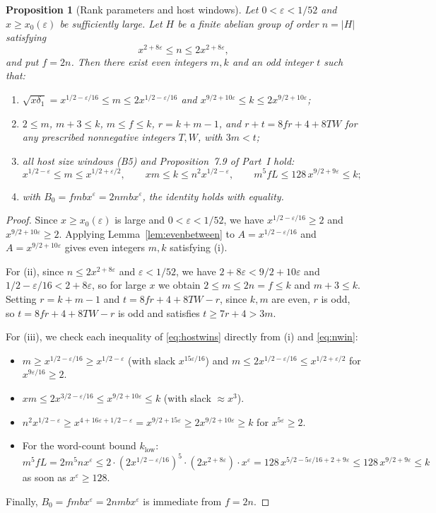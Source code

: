 \documentclass[11pt]{amsart}
\newcommand{\eps}{\varepsilon}
\theoremstyle{plain}
\newtheorem{proposition}[theorem]{Proposition}
\theoremstyle{definition}
\numberwithin{equation}{section}
\begin{document}
\begin{proposition}[Rank parameters and host windows]\label{prop:ranks}
Let $0<\eps<1/52$ and $x\ge x_0(\eps)$ be sufficiently large. Let $H$ be a finite abelian group of
order $n=|H|$ satisfying
\begin{equation}\label{eq:nwin}
x^{2+8\eps}\le n\le 2x^{2+8\eps},
\end{equation}
and put $f=2n$. Then there exist even integers $m,k$ and an odd integer $t$ such that:
\begin{enumerate}[label=(\roman*)]
\item $\sqrt{x\delta_1}=x^{1/2-\eps/16}\le m\le 2x^{1/2-\eps/16}$ and
  $x^{9/2+10\eps}\le k\le 2x^{9/2+10\eps}$;
\item $2\le m$, $m+3\le k$, $m\le f\le k$, $r=k+m-1$, and $r+t=8fr+4+8TW$ for any prescribed
  nonnegative integers $T,W$, with $3m<t$;
\item all host size windows \textup{(B5)} and Proposition~7.9 of Part~I hold:
  \begin{equation}\label{eq:hostwins}
  x^{1/2-\eps}\le m\le x^{1/2+\eps/2},\qquad xm\le k\le n^2 x^{1/2-\eps},\qquad
  m^5 f L\le 128\,x^{9/2+9\eps}\le k;
  \end{equation}
\item with $B_0=fmbx^\eps=2nmbx^\eps$, the identity  holds with equality.
\end{enumerate}
\end{proposition}

\begin{proof}
Since $x\ge x_0(\eps)$ is large and $0<\eps<1/52$, we have $x^{1/2-\eps/16}\ge2$ and
$x^{9/2+10\eps}\ge2$. Applying Lemma~\ref{lem:evenbetween} to $A=x^{1/2-\eps/16}$ and
$A=x^{9/2+10\eps}$ gives even integers $m,k$ satisfying (i).

For (ii), since $n\le 2x^{2+8\eps}$ and $\eps<1/52$, we have $2+8\eps<9/2+10\eps$ and
$1/2-\eps/16<2+8\eps$, so for large $x$ we obtain $2\le m\le 2n=f\le k$ and $m+3\le k$. Setting
$r=k+m-1$ and $t=8fr+4+8TW-r$, since $k,m$ are even, $r$ is odd, so $t=8fr+4+8TW-r$ is odd and
satisfies $t\ge 7r+4>3m$.

For (iii), we check each inequality of \eqref{eq:hostwins} directly from (i) and \eqref{eq:nwin}:
\begin{itemize}
\item $m\ge x^{1/2-\eps/16}\ge x^{1/2-\eps}$ (with slack $x^{15\eps/16}$) and
  $m\le 2x^{1/2-\eps/16}\le x^{1/2+\eps/2}$ for $x^{9\eps/16}\ge2$.
\item $xm\le 2x^{3/2-\eps/16}\le x^{9/2+10\eps}\le k$ (with slack $\approx x^3$).
\item $n^2 x^{1/2-\eps}\ge x^{4+16\eps+1/2-\eps}=x^{9/2+15\eps}\ge 2x^{9/2+10\eps}\ge k$ for
  $x^{5\eps}\ge2$.
\item For the word-count bound $k_{\mathrm{low}}$:
  \[
  m^5 f L = 2m^5 n x^\eps \le 2\cdot (2x^{1/2-\eps/16})^5 \cdot (2x^{2+8\eps}) \cdot x^\eps
  = 128\,x^{5/2-5\eps/16+2+9\eps} \le 128\,x^{9/2+9\eps} \le k
  \]
  as soon as $x^\eps\ge 128$.
\end{itemize}
Finally, $B_0=fmbx^\eps=2nmbx^\eps$ is immediate from $f=2n$.
\end{proof}
\end{document}
